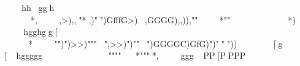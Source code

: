 	
hhggh
	*,,>),,"*,)"")GfffG>),GGGG),,)),""*""*)%
hgghgg[	*"")")>>)"""",>>)")""")GGGGC)GfG)")"""))%
[g
[hggggg
	
""""*"""*,%
gggPP[PPPP			%